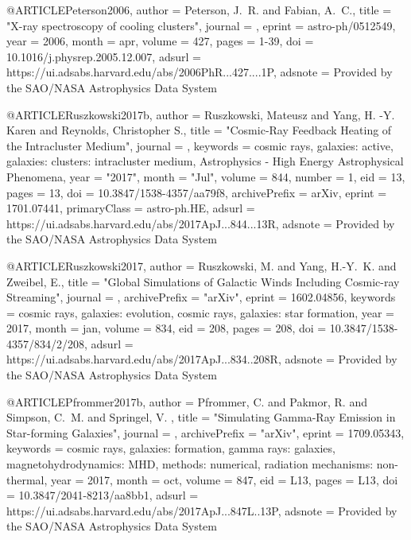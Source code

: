 \documentclass[useAMS,usenatbib]{mnras}
\begin{document}
{{{{{{{@ARTICLE{Peterson2006,
   author = {{Peterson}, J.~R. and {Fabian}, A.~C.},
    title = "{X-ray spectroscopy of cooling clusters}",
  journal = {\physrep},
   eprint = {astro-ph/0512549},
     year = 2006,
    month = apr,
   volume = 427,
    pages = {1-39},
      doi = {10.1016/j.physrep.2005.12.007},
   adsurl = {https://ui.adsabs.harvard.edu/abs/2006PhR...427....1P},
  adsnote = {Provided by the SAO/NASA Astrophysics Data System}
}

@ARTICLE{Ruszkowski2017b,
       author = {{Ruszkowski}, Mateusz and {Yang}, H. -Y. Karen and
         {Reynolds}, Christopher S.},
        title = "{Cosmic-Ray Feedback Heating of the Intracluster Medium}",
      journal = {\apj},
     keywords = {cosmic rays, galaxies: active, galaxies: clusters: intracluster medium, Astrophysics - High Energy Astrophysical Phenomena},
         year = "2017",
        month = "Jul",
       volume = {844},
       number = {1},
          eid = {13},
        pages = {13},
          doi = {10.3847/1538-4357/aa79f8},
archivePrefix = {arXiv},
       eprint = {1701.07441},
 primaryClass = {astro-ph.HE},
       adsurl = {https://ui.adsabs.harvard.edu/abs/2017ApJ...844...13R},
      adsnote = {Provided by the SAO/NASA Astrophysics Data System}
}

@ARTICLE{Ruszkowski2017,
   author = {{Ruszkowski}, M. and {Yang}, H.-Y.~K. and {Zweibel}, E.},
    title = "{Global Simulations of Galactic Winds Including Cosmic-ray Streaming}",
  journal = {\apj},
archivePrefix = "arXiv",
   eprint = {1602.04856},
 keywords = {cosmic rays, galaxies: evolution, cosmic rays, galaxies: star formation},
     year = 2017,
    month = jan,
   volume = 834,
      eid = {208},
    pages = {208},
      doi = {10.3847/1538-4357/834/2/208},
   adsurl = {https://ui.adsabs.harvard.edu/abs/2017ApJ...834..208R},
  adsnote = {Provided by the SAO/NASA Astrophysics Data System}
}

@ARTICLE{Pfrommer2017b,
   author = {{Pfrommer}, C. and {Pakmor}, R. and {Simpson}, C.~M. and {Springel}, V.
	},
    title = "{Simulating Gamma-Ray Emission in Star-forming Galaxies}",
  journal = {\apjl},
archivePrefix = "arXiv",
   eprint = {1709.05343},
 keywords = {cosmic rays, galaxies: formation, gamma rays: galaxies, magnetohydrodynamics: MHD, methods: numerical, radiation mechanisms: non-thermal},
     year = 2017,
    month = oct,
   volume = 847,
      eid = {L13},
    pages = {L13},
      doi = {10.3847/2041-8213/aa8bb1},
   adsurl = {https://ui.adsabs.harvard.edu/abs/2017ApJ...847L..13P},
  adsnote = {Provided by the SAO/NASA Astrophysics Data System}
}

}}}}}}}
\end{document}
